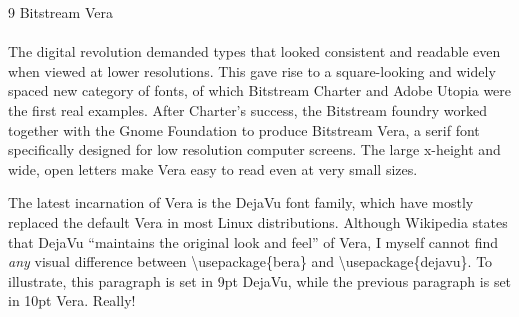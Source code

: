 \documentclass{article}
\begin{document}
\frenchspacing
\noindent
{\LARGE 9 Bitstream Vera}\\
~\\
The digital revolution demanded types that looked consistent and readable even when viewed at lower resolutions. This gave rise to a square-looking and widely spaced new category of fonts, of which Bitstream Charter and Adobe Utopia were the first real examples. After Charter's success, the Bitstream foundry worked together with the Gnome Foundation to produce Bitstream Vera, a serif font specifically designed for low resolution computer screens. The large x-height and wide, open letters make Vera easy to read even at very small sizes.

\fontsize{9pt}{1em}
{\selectfont
The latest incarnation of Vera is the DejaVu font family, which have mostly replaced the default Vera in most Linux distributions. Although Wikipedia states that DejaVu ``maintains the original look and feel'' of Vera, I myself cannot find \emph{any} visual difference between \textbackslash{}usepackage\{bera\} and \textbackslash{}usepackage\{dejavu\}. To illustrate, this paragraph is set in 9pt DejaVu, while the previous paragraph is set in 10pt Vera. Really!
}
\end{document}
